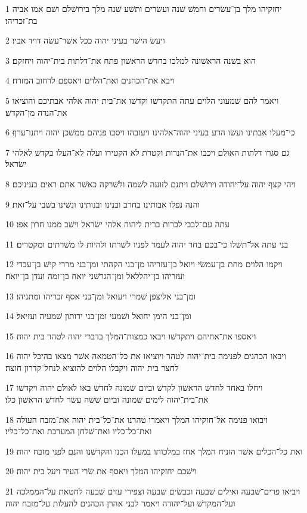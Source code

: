 \par 1 יחזקיהו מלך בן־עשׂרים וחמשׁ שׁנה ועשׂרים ותשׁע שׁנה מלך בירושׁלם ושׁם אמו אביה בת־זכריהו׃
\par 2 ויעשׂ הישׁר בעיני יהוה ככל אשׁר־עשׂה דויד אביו׃
\par 3 הוא בשׁנה הראשׁונה למלכו בחדשׁ הראשׁון פתח את־דלתות בית־יהוה ויחזקם׃
\par 4 ויבא את־הכהנים ואת־הלוים ויאספם לרחוב המזרח׃
\par 5 ויאמר להם שׁמעוני הלוים עתה התקדשׁו וקדשׁו את־בית יהוה אלהי אבתיכם והוציאו את־הנדה מן־הקדשׁ׃
\par 6 כי־מעלו אבתינו ועשׂו הרע בעיני יהוה־אלהינו ויעזבהו ויסבו פניהם ממשׁכן יהוה ויתנו־ערף׃
\par 7 גם סגרו דלתות האולם ויכבו את־הנרות וקטרת לא הקטירו ועלה לא־העלו בקדשׁ לאלהי ישׂראל׃
\par 8 ויהי קצף יהוה על־יהודה וירושׁלם ויתנם לזועה לשׁמה ולשׁרקה כאשׁר אתם ראים בעיניכם׃
\par 9 והנה נפלו אבותינו בחרב ובנינו ובנותינו ונשׁינו בשׁבי על־זאת׃
\par 10 עתה עם־לבבי לכרות ברית ליהוה אלהי ישׂראל וישׁב ממנו חרון אפו׃
\par 11 בני עתה אל־תשׁלו כי־בכם בחר יהוה לעמד לפניו לשׁרתו ולהיות לו משׁרתים ומקטרים׃
\par 12 ויקמו הלוים מחת בן־עמשׂי ויואל בן־עזריהו מן־בני הקהתי ומן־בני מררי קישׁ בן־עבדי ועזריהו בן־יהללאל ומן־הגרשׁני יואח בן־זמה ועדן בן־יואח׃
\par 13 ומן־בני אליצפן שׁמרי ויעואל ומן־בני אסף זכריהו ומתניהו׃
\par 14 ומן־בני הימן יחואל ושׁמעי ומן־בני ידותון שׁמעיה ועזיאל׃
\par 15 ויאספו את־אחיהם ויתקדשׁו ויבאו כמצות־המלך בדברי יהוה לטהר בית יהוה׃
\par 16 ויבאו הכהנים לפנימה בית־יהוה לטהר ויוציאו את כל־הטמאה אשׁר מצאו בהיכל יהוה לחצר בית יהוה ויקבלו הלוים להוציא לנחל־קדרון חוצה׃
\par 17 ויחלו באחד לחדשׁ הראשׁון לקדשׁ וביום שׁמונה לחדשׁ באו לאולם יהוה ויקדשׁו את־בית־יהוה לימים שׁמונה וביום שׁשׁה עשׂר לחדשׁ הראשׁון כלו׃
\par 18 ויבואו פנימה אל־חזקיהו המלך ויאמרו טהרנו את־כל־בית יהוה את־מזבח העולה ואת־כל־כליו ואת־שׁלחן המערכת ואת־כל־כליו׃
\par 19 ואת כל־הכלים אשׁר הזניח המלך אחז במלכותו במעלו הכנו והקדשׁנו והנם לפני מזבח יהוה׃
\par 20 וישׁכם יחזקיהו המלך ויאסף את שׂרי העיר ויעל בית יהוה׃
\par 21 ויביאו פרים־שׁבעה ואילים שׁבעה וכבשׂים שׁבעה וצפירי עזים שׁבעה לחטאת על־הממלכה ועל־המקדשׁ ועל־יהודה ויאמר לבני אהרן הכהנים להעלות על־מזבח יהוה׃
